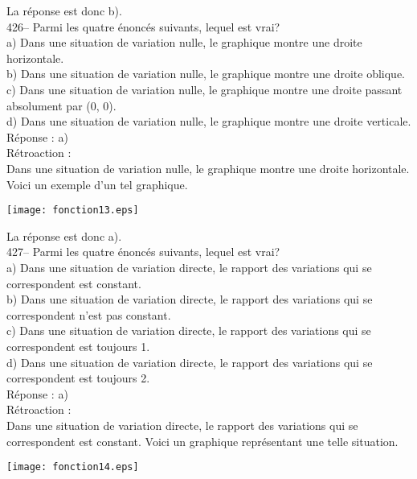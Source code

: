 ﻿\documentclass[letterpaper, 12pt]{article}
\begin{document}
La r\'eponse est donc b).\\

426-- Parmi les quatre \'enonc\'es suivants, lequel est vrai?\\
a) Dans une situation de variation nulle, le graphique montre une droite
horizontale.\\
b) Dans une situation de variation nulle, le graphique montre une droite
oblique.\\
c) Dans une situation de variation nulle, le graphique montre une droite
passant absolument par (0, 0).\\
d) Dans une situation de variation nulle, le graphique montre une droite
verticale.\\

R\'eponse :  a)\\

R\'etroaction : \\
Dans une situation de variation nulle, le graphique montre une droite
horizontale.
Voici un exemple d'un tel graphique.\\
    \begin{center}
    \texttt{[image: fonction13.eps]}
    \end{center}

La r\'eponse est donc a).\\

427-- Parmi les quatre \'enonc\'es suivants, lequel est vrai?\\
a) Dans une situation de variation directe, le rapport des variations qui se
correspondent est constant.\\
b) Dans une situation de variation directe, le rapport des variations qui se
correspondent n'est pas constant.\\
c) Dans une situation de variation directe, le rapport des variations qui se
correspondent est toujours 1.\\
d) Dans une situation de variation directe, le rapport des variations qui se
correspondent est toujours 2.\\

R\'eponse :  a)\\

R\'etroaction : \\
Dans une situation de variation directe, le rapport des variations qui se
correspondent est constant.
Voici un graphique repr\'esentant une telle situation.\\
    \begin{center}
    \texttt{[image: fonction14.eps]}
    \end{center}
\end{document}
